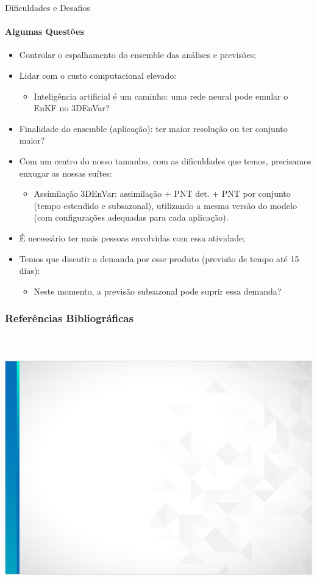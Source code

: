 \documentclass[10pt,aspectratio=169]{beamer}
\begin{document}
\begin{frame}{Dificuldades e Desafios}
\framesubtitle{Algumas Questões \faQuestionCircle}
  \begin{itemize}
	  \item Controlar o espalhamento do ensemble das análises e previsões;
		\pause
		\item Lidar com o custo computacional elevado:
		\begin{itemize}
		  \item Inteligência artificial é um caminho: uma rede neural pode emular o EnKF no 3DEnVar?
		\end{itemize}
		\pause
		\item Finalidade do ensemble (aplicação): ter maior resolução ou ter conjunto maior?
		\item Com um centro do nosso tamanho, com as dificuldades que temos, precisamos enxugar as nossas suítes:
		\begin{itemize}
			\item Assimilação 3DEnVar: assimilação + PNT det. + PNT por conjunto (tempo estendido e subsazonal), utilizando a mesma versão do modelo (com configurações adequadas para cada aplicação).
		\end{itemize}
		\pause
		\item É necessário ter mais pessoas envolvidas com essa atividade;
		\pause
		\item Temos que discutir a demanda por esse produto (previsão de tempo até 15 dias):
		\begin{itemize}
			\item Neste momento, a previsão subsazonal pode suprir essa demanda?
		\end{itemize}
		\pause
	\end{itemize}
\end{frame}

\begin{frame}
\frametitle{Referências Bibliográficas}
\framesubtitle{\faBookOpen~\faNewspaper[regular]~}
  \vspace{-1em}
  \footnotesize
\end{frame}

\usebackgroundtemplate%
{%
  \includegraphics[width=\paperwidth,height=\paperheight]{fundo_slide_inpe_sem_logo.png}%
}
\end{document}
